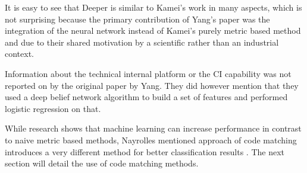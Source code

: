 It is easy to see that Deeper is similar to Kamei's work in many aspects, which is not surprising because the primary contribution of Yang's paper was the integration of the neural network instead of Kamei's purely metric based method and 
due to their shared motivation by a scientific rather than an industrial context.

Information about the technical internal platform or the CI capability was not reported on by the original paper by Yang. They did however mention that they used a deep belief network algorithm to build a set of features and performed logistic regression on that.

While research shows that machine learning can increase performance in contrast to naive metric based methods, Nayrolles mentioned approach of code matching introduces a very different method for better classification results \cite{Nayrolles2018}. The next section will detail the use of code matching methods.






